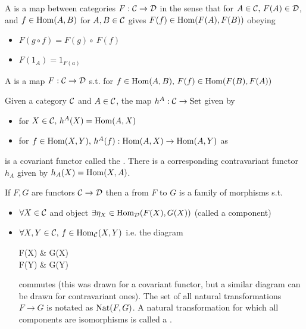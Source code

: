 \documentclass{article}
\begin{document}
\begin{definition}
	A  is a map between categories $F: \mathcal{C} \to \mathcal{D}$ in the sense that for $A \in \mathcal{C}, \, F(A) \in \mathcal{D}$, and $f \in \operatorname{Hom}(A,B)$ for $A,B \in \mathcal{C}$ gives $F(f) \in \operatorname{Hom}(F(A), F(B))$ obeying 
	\begin{itemize}
		\item $F(g \circ f) = F(g) \circ ~F(f)$ 
		\item $F(1_A) = 1_{F(a)}$
	\end{itemize}
	A  is a map $F:\mathcal{C} \to \mathcal{D}$ s.t. for $f \in \operatorname{Hom}(A,B), \, F(f) \in \operatorname{Hom}(F(B),F(A))$
\end{definition}

\begin{example}
	Given a category $\mathcal{C}$ and $A \in \mathcal{C}$, the map $h^A :\mathcal{C} \to \text{Set}$ given by 
	\begin{itemize}
		\item for $X \in \mathcal{C}, \, h^A(X) = \operatorname{Hom}(A,X)$
		\item for $f \in \operatorname{Hom}(X,Y), \, h^A(f):\operatorname{Hom}(A,X) \to \operatorname{Hom}(A,Y)$ as 
	\end{itemize}
	is a covariant functor called the . There is a corresponding contravariant functor $h_A$ given by $h_A(X) = \operatorname{Hom}(X,A)$.
\end{example}

\begin{definition}
	If $F,G$ are functors $\mathcal{C} \to \mathcal{D}$ then a  from $F$ to $G$ is a family of morphisms s.t. 
	\begin{itemize}
		\item $\forall X \in \mathcal{C}$ and object $\exists \eta_X \in \operatorname{Hom}_{\mathcal{D}}(F(X),G(X))$ (called a component)
		\item $\forall X,Y \in \mathcal{C}, \, f \in \operatorname{Hom}_{\mathcal{C}}(X,Y)$
		i.e. the diagram 
		\begin{tkz}
			F(X) \arrow[r,"\eta_X"] \arrow[d,"F(Y)"'] & G(X) \arrow[d,"G(f)"] \\
			F(Y) \arrow[r,"\eta_Y"'] & G(Y)
		\end{tkz}
		commutes (this was drawn for a covariant functor, but a similar diagram can be drawn for contravariant ones). The set of all natural transformations $F \to G$ is notated as $\operatorname{Nat}(F,G)$. A natural transformation for which all components are isomorphisms is called a .
	\end{itemize}
\end{definition}
\end{document}
